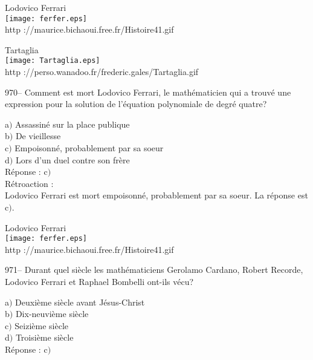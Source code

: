 ﻿\documentclass[letterpaper, 12pt]{article}
\begin{document}
        \begin{center}
        Lodovico Ferrari\\
    \texttt{[image: ferfer.eps]}\\
        {\footnotesize http ://maurice.bichaoui.free.fr/Histoire41.gif}
    \end{center}

        \begin{center}
        Tartaglia\\
    \texttt{[image: Tartaglia.eps]}\\
        {\footnotesize http
://perso.wanadoo.fr/frederic.gales/Tartaglia.gif}
    \end{center}

970-- Comment est mort Lodovico Ferrari, le math\'ematicien qui a
trouv\'e une expression pour la solution de l'\'equation polynomiale
de degr\'e quatre?

a$)$ Assassin\'e sur la place publique \\
b$)$ De vieillesse  \\
c$)$ Empoisonn\'e, probablement par sa soeur \\
d$)$ Lors d'un duel contre son fr\`ere \\

R\'eponse : c$)$\\

R\'etroaction : \\
Lodovico Ferrari est mort empoisonn\'e, probablement par sa soeur.
La r\'eponse est c$)$.

        \begin{center}
        Lodovico Ferrari\\
    \texttt{[image: ferfer.eps]}\\
        {\footnotesize http ://maurice.bichaoui.free.fr/Histoire41.gif}
    \end{center}

971-- Durant quel si\`ecle les math\'ematiciens Gerolamo Cardano,
Robert Recorde, Lodovico Ferrari et Raphael Bombelli ont-ils v\'ecu?

a$)$ Deuxi\`eme si\`ecle avant J\'esus-Christ \\
b$)$ Dix-neuvi\`eme si\`ecle \\
c$)$ Seizi\`eme si\`ecle  \\
d$)$ Troisi\`eme si\`ecle \\

R\'eponse : c$)$\\
\end{document}
